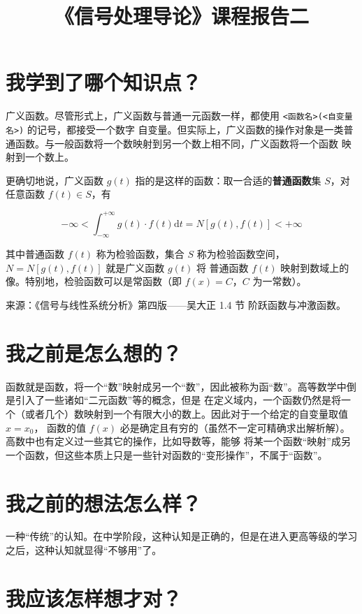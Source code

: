 \documentclass{ctexart}
\title{《信号处理导论》课程报告二}
\begin{document}
    \maketitle

    \section{我学到了哪个知识点？}

    广义函数。尽管形式上，广义函数与普通一元函数一样，都使用 \verb|<函数名>(<自变量名>)| 的记号，都接受一个数字
    自变量。但实际上，广义函数的操作对象是一类普通函数。与一般函数将一个数映射到另一个数上相不同，广义函数将一个函数
    映射到一个数上。

    更确切地说，广义函数 $g(t)$ 指的是这样的函数：取一合适的\textbf{普通函数}集 $S$，对任意函数 $f(t) \in S$，有

    \[
        -\infty < \int_{-\infty}^{+\infty} g(t) \cdot f(t) \mathrm{d}t = N[g(t), f(t)] < +\infty
    \]

    其中普通函数 $f(t)$ 称为检验函数，集合 $S$ 称为检验函数空间，$N = N[g(t), f(t)]$ 就是广义函数 $g(t)$ 将
    普通函数 $f(t)$ 映射到数域上的像。特别地，检验函数可以是常函数（即 $f(x) = C$，$C$ 为一常数）。

    来源：《信号与线性系统分析》第四版——吴大正 1.4 节 阶跃函数与冲激函数。

    \section{我之前是怎么想的？}

    函数就是函数，将一个“数”映射成另一个“数”，因此被称为函“数”。高等数学中倒是引入了一些诸如“二元函数”等的概念，但是
    在定义域内，一个函数仍然是将一个（或者几个）数映射到一个有限大小的数上。因此对于一个给定的自变量取值 $x = x_0$，
    函数的值 $f(x)$ 必是确定且有穷的（虽然不一定可精确求出解析解）。高数中也有定义过一些其它的操作，比如导数等，能够
    将某一个函数“映射”成另一个函数，但这些本质上只是一些针对函数的“变形操作”，不属于“函数”。

    \section{我之前的想法怎么样？}

    一种“传统”的认知。在中学阶段，这种认知是正确的，但是在进入更高等级的学习之后，这种认知就显得``不够用''了。

    \section{我应该怎样想才对？}
\end{document}
